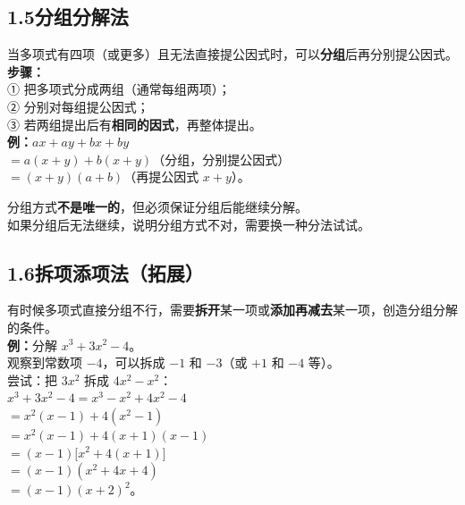 \documentclass[12pt, a4paper]{ctexart}
\begin{document}
\subsection*{1.5\quad 分组分解法}

\begin{knowledgebox}[分组分解法]
当多项式有四项（或更多）且无法直接提公因式时，可以\textbf{分组}后再分别提公因式。\\[6pt]
\textbf{步骤：}\\
① 把多项式分成两组（通常每组两项）；\\
② 分别对每组提公因式；\\
③ 若两组提出后有\textbf{相同的因式}，再整体提出。\\[6pt]
\textbf{例：}\quad $ax + ay + bx + by$\\
$= a(x+y) + b(x+y)$\quad（分组，分别提公因式）\\
$= (x+y)(a+b)$\quad（再提公因式 $x+y$）。
\end{knowledgebox}

\begin{warnbox}[分组的关键]
分组方式\textbf{不是唯一的}，但必须保证分组后能继续分解。\\
如果分组后无法继续，说明分组方式不对，需要换一种分法试试。
\end{warnbox}

\subsection*{1.6\quad 拆项添项法（拓展）}

\begin{knowledgebox}[拆项添项法]
有时候多项式直接分组不行，需要\textbf{拆开}某一项或\textbf{添加再减去}某一项，创造分组分解的条件。\\[6pt]
\textbf{例：}\quad 分解 $x^3 + 3x^2 - 4$。\\[3pt]
观察到常数项 $-4$，可以拆成 $-1$ 和 $-3$（或 $+1$ 和 $-4$ 等）。\\
尝试：把 $3x^2$ 拆成 $4x^2 - x^2$：\\[3pt]
$x^3 + 3x^2 - 4 = x^3 - x^2 + 4x^2 - 4$\\
$= x^2(x-1) + 4(x^2-1)$\\
$= x^2(x-1) + 4(x+1)(x-1)$\\
$= (x-1)\big[x^2 + 4(x+1)\big]$\\
$= (x-1)(x^2 + 4x + 4)$\\
$= (x-1)(x+2)^2$。
\end{knowledgebox}
\end{document}
